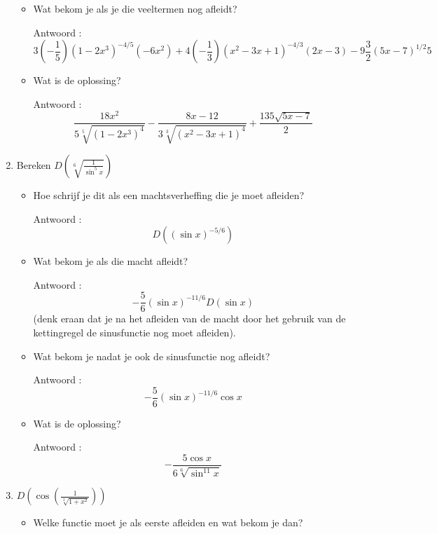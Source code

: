 \begin{enumerate}
\begin{itemize}
		\item Wat bekom je als je die veeltermen nog afleidt?
		
		Antwoord : \[3\left(- \frac{1}{5} \right)\left( 1-2x^3  \right)^{-4/5}\left( -6x^2  \right)+4\left( -\frac{1}{3}  \right)\left( x^2-3x+1  \right)^{-4/3}\left(2 x-3  \right)-9\frac{3}{2}\left( 5x-7  \right)^{1/2}5\]
		
		\item Wat is de oplossing?
		
		Antwoord : \[\frac{18x^2}{5\sqrt[5]{\left( 1-2x^3 \right) ^4}}-\frac{8x-12}{3\sqrt[3]{\left( x^2-3x+1 \right)^4}}+\frac{135 \sqrt{5x-7}}{2}\]
		
	\end{itemize}
	
	\item Bereken $D \left( \sqrt[6]{\frac{1}{\sin ^5x}}  \right)$
	
	\begin{itemize}
		
		\item Hoe schrijf je dit als een machtsverheffing die je moet afleiden?
		
		Antwoord : \[D \left( (\sin x)^{-5/6}  \right)\]
		
		\item Wat bekom je als die macht afleidt? 
		
		Antwoord : \[-\frac{5}{6} (\sin x)^{-11/6} D(\sin x)\] (denk eraan dat je na het afleiden van de macht door het gebruik van de kettingregel de sinusfunctie nog moet afleiden).
		
		\item Wat bekom je nadat je ook de sinusfunctie nog afleidt?
		
		Antwoord : \[-\frac{5}{6} (\sin x)^{-11/6} \cos x\]
		
		\item Wat is de oplossing?
		
		Antwoord : \[-\frac{5 \cos x}{6 \sqrt[6]{\sin ^{11}x}}\]
		
	\end{itemize}
	
	\item $D \left( \cos \left( \frac {1}{\sqrt[3]{1+x^2}}  \right)  \right)$
	
	\begin{itemize}
		
		\item Welke functie moet je als eerste afleiden en wat bekom je dan?
		

\end{itemize}
\end{enumerate}
